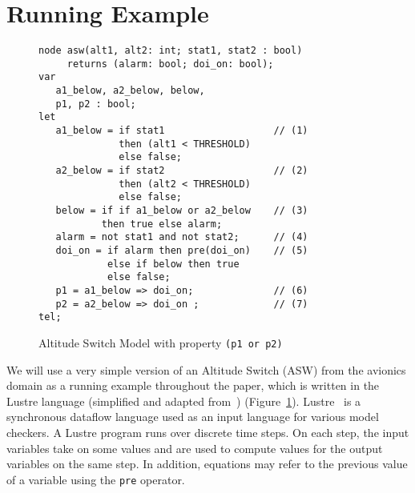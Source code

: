\section{Running Example}
\label{sec:example}


\begin{figure}[t]
\centering
{\smaller
\begin{verbatim}
node asw(alt1, alt2: int; stat1, stat2 : bool)
     returns (alarm: bool; doi_on: bool);
var
   a1_below, a2_below, below,
   p1, p2 : bool;
let
   a1_below = if stat1                   // (1)
              then (alt1 < THRESHOLD)    
              else false;               
   a2_below = if stat2                   // (2)
              then (alt2 < THRESHOLD)    
              else false;                 
   below = if if a1_below or a2_below    // (3)
           then true else alarm;
   alarm = not stat1 and not stat2;      // (4)
   doi_on = if alarm then pre(doi_on)    // (5)
            else if below then true      
            else false;                  
   p1 = a1_below => doi_on;              // (6)
   p2 = a2_below => doi_on ;             // (7)
tel;
\end{verbatim}
}
\vspace{-0.1in}
\caption{Altitude Switch Model with property \small{\texttt{(p1 or p2)}}}
\label{fig:asw}
\end{figure}

We will use a very simple version of an Altitude Switch (ASW) from the avionics domain as a running example throughout the paper, which is written in the Lustre language (simplified and adapted from~\cite{HCW02:ase-deviation}) (Figure~\ref{fig:asw}).
Lustre~\cite{Halbwachs91:lustre} is a synchronous dataflow language
used as an input language for various model checkers. A Lustre program runs over discrete
time steps. On each step, the input variables take on some values and
are used to compute values for the output variables on the same step.
In addition, equations may refer to the previous value of a variable
using the {\tt pre} operator.

